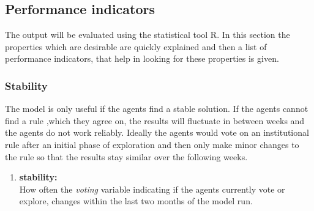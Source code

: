 \documentclass[a4paper]{article}
\begin{document}
\subsection{Performance indicators}
The output will be evaluated using the statistical tool R. In this section the properties which are desirable 
are quickly explained and then a list of performance indicators, that help in looking for these properties is given.\\

\subsubsection{Stability}
The model is only useful if the agents find a stable solution. If the agents cannot find a rule ,which they agree on,
the results will fluctuate in between weeks and the agents do not work reliably. Ideally the agents would vote on an 
institutional rule after an initial phase of exploration and then only make minor changes to the rule so that 
the results stay similar over the following weeks.\\
\begin{enumerate}
 \item \textbf{stability:}\\
 How often the \textit{voting} variable indicating if the agents currently vote or explore, changes within the last 
 two months of the model run. 
\end{enumerate}
\end{document}
